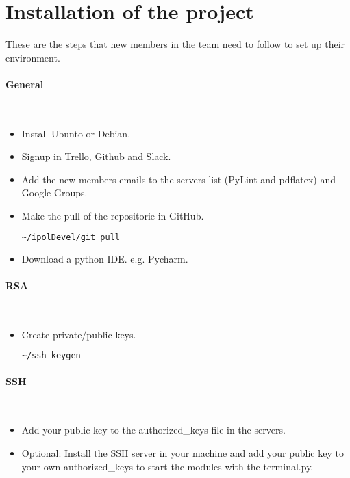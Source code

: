 \section{Installation of the project}


These are the steps that new members in the team need to follow to set up their environment.

\paragraph{General} \hspace{0pt} \\
\begin{itemize}
 \item Install Ubunto or Debian.
 \item Signup in Trello, Github and Slack.
 \item Add the new members emails to the servers list (PyLint and pdflatex) and Google Groups.
 \item Make the pull of the repositorie in GitHub.
  \begin{lstlisting}[language=Bash]
  ~/ipolDevel/git pull
  \end{lstlisting}
 \item Download a python IDE. e.g. Pycharm.
\end{itemize}

\paragraph{RSA} \hspace{0pt} \\
\begin{itemize}
 \item Create private/public keys.
  \begin{lstlisting}[language=Bash]
  ~/ssh-keygen
  \end{lstlisting}
\end{itemize}

\paragraph{SSH} \hspace{0pt} \\
\begin{itemize}
 \item Add your public key to the authorized\_keys file in the servers.
 \item Optional: Install the SSH server in your machine and add your public key to your own authorized\_keys to start the modules with the terminal.py.
\end{itemize}

